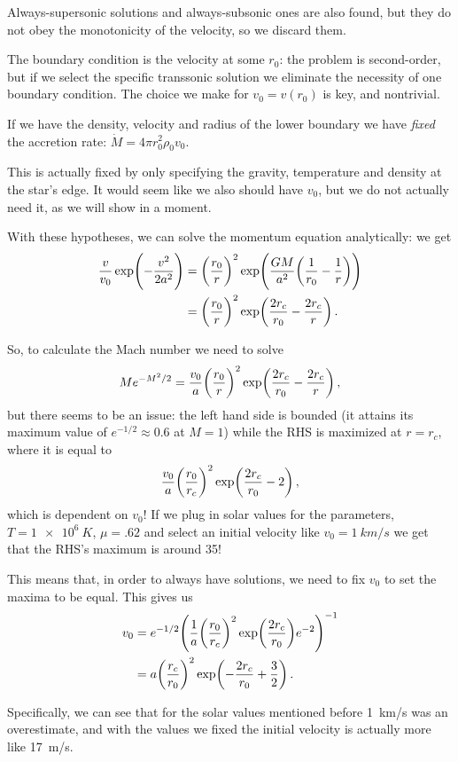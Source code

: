 \documentclass[main.tex]{subfiles}
\begin{document}
Always-supersonic solutions and always-subsonic ones are also found, but they do not obey the monotonicity of the velocity, so we discard them.

The boundary condition is the velocity at some \(r_0 \): the problem is second-order, but if we select the specific transsonic solution we eliminate the necessity of one boundary condition.
The choice we make for \(v_0  = v(r_0)\) is key, and nontrivial.

If we have the density, velocity and radius of the lower boundary we have \emph{fixed} the accretion rate: \(\dot{M}  = 4 \pi r_0^2 \rho_0 v_0 \). 

This is actually fixed by only specifying the gravity, temperature and density at the star's edge. It would seem like we also should have \(v_0 \), but we do not actually need it, as we will show in a moment.

With these hypotheses, we can solve the momentum equation analytically: we get 
%
\begin{subequations}
\begin{align} \label{eq:isothermal-wind-speed-equation}
\frac{v}{v_0 } \exp( -\frac{v^2}{2 a^2}) &= \qty(\frac{r_0}{r})^2 \exp(\frac{GM}{a^2} \qty(\frac{1}{r_0 } - \frac{1}{r}))  \\
&= \qty(\frac{r_0}{r})^2 \exp(\frac{2r_c}{r_0 } - \frac{2r_c}{r})
\,.
\end{align}
\end{subequations}
%

\begin{bluebox}
So, to calculate the Mach number we need to solve 
%
\begin{align} 
M e^{-M^2/2} = \frac{v_0 }{a} \qty(\frac{r_0 }{r})^2 \exp(\frac{2r_c}{r_0 } - \frac{2 r_c}{r})
\,,
\end{align}
%
but there seems to be an issue: the left hand side is bounded (it attains its maximum value of \(e^{-1/2} \approx 0.6\) at \(M=1\)) while the RHS is maximized at \(r = r_c\), where it is equal to 
%
\begin{align}
\frac{v_0}{a} \qty(\frac{r_0 }{r_c})^2 \exp(\frac{2r_c}{r_0 } - 2)
\,,
\end{align}
%
which is dependent on \(v_0 \)! If we plug in solar values for the parameters, \(T = \SI{1e6}{K}\), \(\mu = \num{.62}\) and select an initial velocity like \(v_0 = \SI{1}{km/s}\) we get that the RHS's maximum is around 35! 

This means that, in order to always have solutions, we need to fix \(v_0 \) to set the maxima to be equal.
This gives us 
%
\begin{subequations}
\begin{align}
v_0 &= e^{-1/2}  \qty(\frac{1}{a} \qty(\frac{r_0}{r_c})^2
\exp(\frac{2 r_c}{r_0 }) e^{-2})^{-1} \\
&= a \qty(\frac{r_c}{r_0 })^2 \exp(-  \frac{2r_c}{r_0 } + \frac{3}{2})
\,.
\end{align}
\end{subequations}

Specifically, we can see that for the solar values mentioned before \SI{1}{km/s} was an overestimate, and with the values we fixed the initial velocity is actually more like \SI{17}{m/s}.
\end{bluebox}
\end{document}
